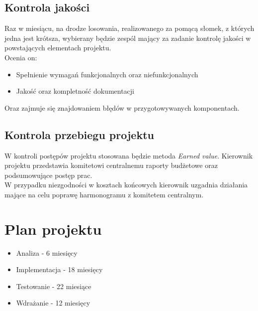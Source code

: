 \documentclass[12pt]{article}
\begin{document}
\subsection{Kontrola jakości}
Raz w miesiącu, na drodze losowania, realizowanego za pomącą słomek, z których jedna jest krótsza, wybierany będzie zespól mający za zadanie kontrolę jakości w powstających elementach projektu.\\
Ocenia on:
\begin{itemize}
\item Spełnienie wymagań funkcjonalnych oraz niefunkcjonalnych
\item Jakość oraz kompletność dokumentacji
\end{itemize}
Oraz zajmuje się znajdowaniem błędów w przygotowywanych komponentach.
\subsection{Kontrola przebiegu projektu}
W kontroli postępów projektu stosowana będzie metoda \textit{Earned value}.
Kierownik projektu przedstawia komitetowi centralnemu raporty budżetowe oraz podsumowujące postęp prac.\\
W przypadku niezgodności w kosztach końcowych kierownik uzgadnia działania mające na celu poprawę harmonogramu z komitetem centralnym.

\newpage
\section{Plan projektu}
\begin{itemize}
\item Analiza - 6 miesięcy
\item Implementacja - 18 miesięcy
\item Testowanie - 22 miesiące
\item Wdrażanie - 12 miesięcy
\end{itemize}
\end{document}

